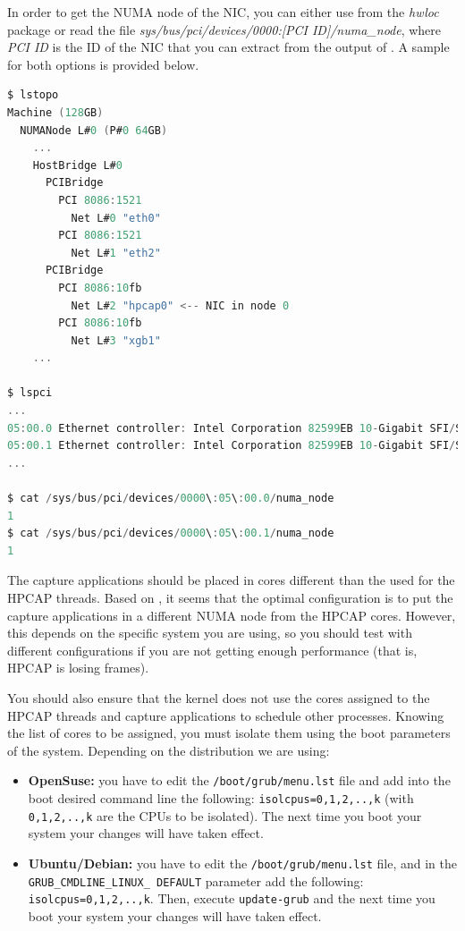 \documentclass[a4paper,oneside]{hpman}
\begin{document}
In order to get the NUMA node of the NIC, you can either use  from the \textit{hwloc} package or read the file \textit{sys/bus/pci/devices/0000:[PCI ID]/numa\_node}, where \textit{PCI ID} is the ID of the NIC that you can extract from the output of . A sample for both options is provided below.

\begin{lstlisting}[language=C, caption={Obtaining NUMA information.}, label={lst:NUMA}]
$ lstopo
Machine (128GB)
  NUMANode L#0 (P#0 64GB)
    ...
    HostBridge L#0
      PCIBridge
        PCI 8086:1521
          Net L#0 "eth0"
        PCI 8086:1521
          Net L#1 "eth2"
      PCIBridge
        PCI 8086:10fb
          Net L#2 "hpcap0" <-- NIC in node 0
        PCI 8086:10fb
          Net L#3 "xgb1"
    ...

$ lspci
...
05:00.0 Ethernet controller: Intel Corporation 82599EB 10-Gigabit SFI/SFP+ Network Connection (rev 01)
05:00.1 Ethernet controller: Intel Corporation 82599EB 10-Gigabit SFI/SFP+ Network Connection (rev 01)
...

$ cat /sys/bus/pci/devices/0000\:05\:00.0/numa_node
1
$ cat /sys/bus/pci/devices/0000\:05\:00.1/numa_node
1
\end{lstlisting}

The capture applications should be placed in cores different than the used for the HPCAP threads. Based on \cite{m3omon}, it seems that the optimal configuration is to put the capture applications in a different NUMA node from the HPCAP cores. However, this depends on the specific system you are using, so you should test with different configurations if you are not getting enough performance (that is, HPCAP is losing frames).

You should also ensure that the kernel does not use the cores assigned to the HPCAP threads and capture applications to schedule other processes. Knowing the list of cores to be assigned, you must isolate them using the boot parameters of the system. Depending on the distribution we are using:

\begin{itemize}
    \item \textbf{OpenSuse:} you have to edit the \texttt{/boot/grub/menu.lst} file and add into the boot desired command line the following: \texttt{isolcpus=0,1,2,..,k} (with \texttt{0,1,2,..,k} are the CPUs to be isolated). The next time you boot your system your changes will have taken effect.

    \item \textbf{Ubuntu/Debian:} you have to edit the \texttt{/boot/grub/menu.lst} file, and in the \texttt{GRUB\_CMDLINE\_LINUX\_ DEFAULT} parameter add the following: \texttt{isolcpus=0,1,2,..,k}. Then, execute \texttt{update-grub} and the next time you boot your system your changes will have taken effect.

\end{itemize}
\end{document}
